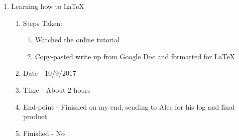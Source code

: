 \documentclass[journal,10pt,onecolumn,compsoc]{IEEEtran} \usepackage[margin=1.0in]{geometry} \usepackage{pdfpages}
\begin{document}
\begin{enumerate}
	\item Learning how to LaTeX
		\begin{enumerate}[label=(\Alph*)]
			\item Steps Taken:
				\begin{enumerate}[label=(\alph*)]
					\item Watched the online tutorial
					\item Copy-pasted write up from Google Doc and formatted for LaTeX
				\end{enumerate}
			\item Date - 10/9/2017
			\item Time - About 2 hours
			\item End-point - Finished on my end, sending to Alec for his log and final product
			\item Finished -  No
		\end {enumerate}		
	\end{enumerate}
\end{document}
